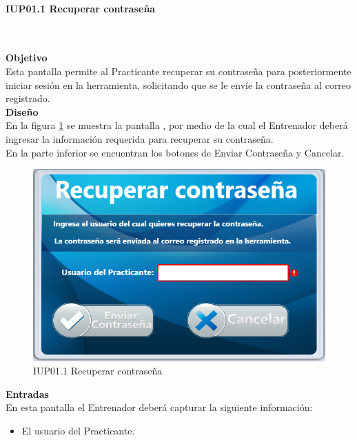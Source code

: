 \paragraph{IUP01.1 Recuperar contraseña} \hspace{1cm}\\ 
\label{pant:IUP01.1} 

\textbf{\textcolor[rgb]{0, 0, 0.545098}{Objetivo}}\\
Esta pantalla permite al Practicante recuperar su contraseña para posteriormente iniciar sesión en la herramienta, solicitando que se le envíe la contraseña al correo registrado.\\

\textbf{\textcolor[rgb]{0, 0, 0.545098}{Diseño}}\\
En la figura \ref{fig:IUP01.1} se muestra la pantalla , por medio de la cual el Entrenador deberá ingresar la información requerida para recuperar su contraseña.\\

En la parte inferior se encuentran los botones de Enviar Contraseña y Cancelar.

\begin{figure}[H]
	\centering
		\includegraphics[scale=0.8]{./Figuras/Pantallas/IUP01_1Recuperar_contrasena}
	\caption{IUP01.1 Recuperar contraseña}
	\label{fig:IUP01.1}
\end{figure}

\textbf{\textcolor[rgb]{0, 0, 0.545098}{Entradas}}\\
En esta pantalla el Entrenador deberá capturar la siguiente información:

\begin{itemize}
	\item El usuario del Practicante.
\end{itemize}
\vspace{1em}


